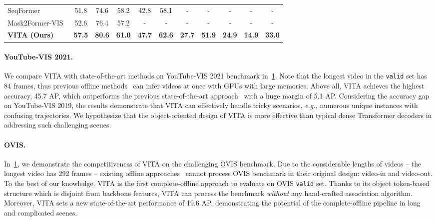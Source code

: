 \documentclass{article}
\begin{document}
\begin{table}
{\begin{tabular}{@{}l|ccccc|ccccc@{}}
\midrule
\midrule
SeqFormer~\cite{SeqFormer}   & 51.8  & 74.6      & 58.2      & 42.8      & 58.1      & -     & -         & -         & -         & -     \\
Mask2Former-VIS~\cite{Mask2Former-VIS}  & 52.6  & 76.4      & 57.2      & -         & -         & -     & -         & -         & -         & -     \\
\midrule
\textbf{VITA (Ours)}                    & \textbf{57.5} & \textbf{80.6} & \textbf{61.0} & \textbf{47.7} & \textbf{62.6} & \textbf{27.7} & \textbf{51.9} & \textbf{24.9} & \textbf{14.9} & \textbf{33.0}\\
\bottomrule
\end{tabular}
} \label{tab:ytvis2021}
\end{table} 

\paragraph{YouTube-VIS 2021.}
We compare VITA with state-of-the-art methods on YouTube-VIS 2021 benchmark in~\cref{tab:ytvis2021}. 
Note that the longest video in the \texttt{valid} set has 84 frames, thus previous offline methods~\cite{IFC, SeqFormer, Mask2Former-VIS} can infer videos at once with GPUs with large memories.
Above all, VITA achieves the highest accuracy, 45.7 AP, which outperforms the previous state-of-the-art approach~\cite{Mask2Former-VIS} with a huge margin of 5.1 AP.
Considering the accuracy gap on YouTube-VIS 2019, the results demonstrate that VITA can effectively handle tricky scenarios, \textit{e.g.,} numerous unique instances with confusing trajectories.
We hypothesize that the object-oriented design of VITA is more effective than typical dense Transformer decoders in addressing such challenging scenes.


\paragraph{OVIS.}
In~\cref{tab:ytvis2021}, we demonstrate the competitiveness of VITA on the challenging OVIS benchmark.
Due to the considerable lengths of videos -- the longest video has 292 frames -- existing offline approaches~\cite{VisTR, IFC, TeViT, SeqFormer, Mask2Former-VIS} cannot process OVIS benchmark in their original design: video-in and video-out.
To the best of our knowledge, VITA is the first complete-offline approach to evaluate on OVIS \texttt{valid} set.
Thanks to its object token-based structure which is disjoint from backbone features, VITA can process the benchmark \emph{without} any hand-crafted association algorithm.
Moreover, VITA sets a new state-of-the-art performance of 19.6 AP, demonstrating the potential of the complete-offline pipeline in long and complicated scenes.
\end{document}
